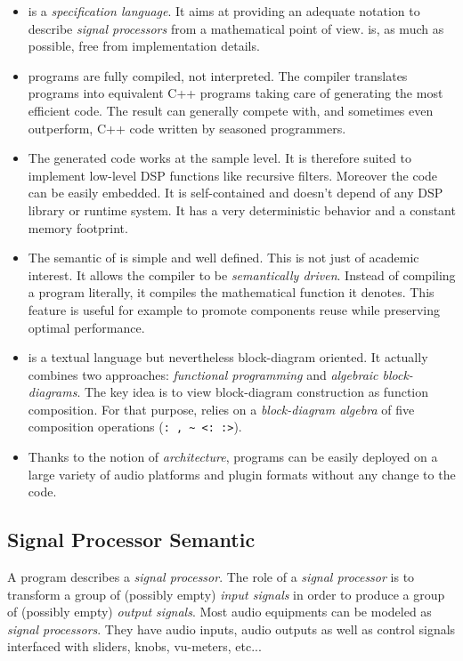 \begin{itemize}

\item \faust is a \textit{specification language}. It aims at providing an adequate notation to describe \textit{signal processors} from a mathematical point of view. \faust is, as much as possible, free from implementation details. 

\item \faust programs are fully compiled, not interpreted. The compiler translates \faust programs into equivalent C++ programs taking care of generating the most efficient code. The result can generally compete with, and sometimes even outperform, C++ code written by seasoned programmers. 

\item The generated code works at the sample level. It is therefore suited to implement low-level DSP functions like recursive filters. Moreover the code can be easily embedded. It is self-contained and doesn't depend of any DSP library or runtime system. It has a very deterministic behavior and a constant memory footprint. 

\item The semantic of \faust is simple and well defined. This is not just of academic interest. It allows the \faust compiler to be \emph{semantically driven}. Instead of compiling a program literally, it compiles the mathematical function it denotes. This feature is useful for example to promote components reuse while preserving optimal performance.  

\item \faust is a textual language but nevertheless block-diagram oriented. It actually combines two approaches: \textit{functional programming} and \textit{algebraic block-diagrams}. The key idea is to view block-diagram construction as function composition. For that purpose, \faust relies on a \emph{block-diagram algebra} of five composition operations (\lstinline': , ~ <: :>').

\item Thanks to the notion of \textit{architecture}, \faust programs can be easily deployed on a large variety of audio platforms and plugin formats without any change to the \faust code.

\end{itemize}

\subsection{Signal Processor Semantic}
A \faust program describes a \emph{signal processor}. 
The role of a \textit{signal processor} is to transform a group  of (possibly empty) \emph{input signals} in order to produce a group of (possibly empty) \emph{output signals}. 
Most audio equipments can be modeled as \emph{signal processors}. 
They have audio inputs, audio outputs as well as control signals interfaced with sliders, knobs, vu-meters, etc... \\

